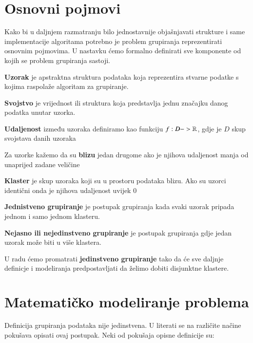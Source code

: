 \documentclass[a4paper,twoside,12pt]{memoir} %
\begin{document}
\section[Osnovni pojmovi][os-pojmovi]{Osnovni pojmovi}
\label{sec:os-pojmovi}
Kako bi u daljnjem razmatranju bilo jednostavnije objašnjavati strukture i same implementacije algoritama potrebno je problem grupiranja reprezentirati osnovnim pojmovima. U nastavku ćemo formalno definirati sve komponente od kojih se problem grupiranja sastoji.
\begin{defn}
\label{def:uzorak}
\textbf{Uzorak} je apstraktna struktura podataka koja reprezentira stvarne podatke s kojima raspolaže algoritam za grupiranje.
\end{defn}
\begin{defn}
\label{def:svojstvo}
\textbf{Svojstvo} je vrijednost ili struktura koja predstavlja jednu značajku danog podatka unutar uzorka.
\end{defn}
\begin{defn}
\label{def:udaljenost}
\textbf{Udaljenost} između uzoraka definiramo kao funkciju 
$f: D  -> \mathbb{R}$, gdje je $D$ skup svojstava danih uzoraka
\end{defn}
\begin{defn}
\label{def:blizina}
Za uzorke kažemo da su \textbf{blizu} jedan drugome ako je njihova udaljenost manja od unaprijed zadane veličine
\end{defn}
\begin{defn}
\label{def:klaster}
\textbf{Klaster} je skup uzoraka koji su u prostoru podataka blizu. Ako su uzorci identični onda je njihova udaljenost uvijek $0$
\end{defn}
\begin{defn}
\label{def:hard}
\textbf{Jednistveno grupiranje} je postupak grupiranja kada svaki uzorak pripada jednom i samo jednom klasteru.
\end{defn}
\begin{defn}
\label{def:fuzzy}
\textbf{Nejasno ili nejedinstveno grupiranje} je postupak grupiranja gdje jedan uzorak može biti u više klastera.
\end{defn}
\begin{rem}
U radu ćemo promatrati \textbf{jedinstveno grupiranje} tako da će sve daljnje definicje i modeliranja predpostavljati da želimo dobiti disjunktne klastere.
\end{rem}

\section[Matematičko modeliranje problema][Matematičko modeliranje]{Matematičko modeliranje problema}
\label{sec:mat-mod}
Definicija grupiranja podataka nije jedinstvena. U literati se na različite načine pokušava opisati ovaj postupak. Neki od pokušaja opisne definicije su:
\end{document}
